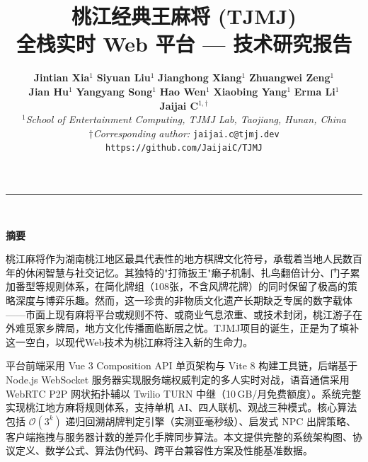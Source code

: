 \documentclass[11pt,a4paper]{article}
\title{\bfseries\LARGE\color{blue!60!black} 桃江经典王麻将 (TJMJ)\\[4pt]
       \large\color{blue!50!black} 全栈实时 Web 平台 — 技术研究报告}
\author{%
  \begin{tabular}{c}
  \small\textbf{Jintian Xia}$^{1}$ \quad \textbf{Siyuan Liu}$^{1}$ \quad \textbf{Jianghong Xiang}$^{1}$ \quad \textbf{Zhuangwei Zeng}$^{1}$ \\
  \small\textbf{Jian Hu}$^{1}$ \quad \textbf{Yangyang Song}$^{1}$ \quad \textbf{Hao Wen}$^{1}$ \quad \textbf{Xiaobing Yang}$^{1}$ \quad \textbf{Erma Li}$^{1}$ \\[4pt]
  \small\textbf{Jaijai C}$^{1,\dagger}$ \\[2pt]
  \small$^{1}$\textit{School of Entertainment Computing, TJMJ Lab, Taojiang, Hunan, China} \\
  \small$\dagger$\textit{Corresponding author: }\texttt{jaijai.c@tjmj.dev} \\[2pt]
  \small\texttt{\color{blue}https://github.com/JaijaiC/TJMJ}
  \end{tabular}
}
\date{}
\begin{document}
\maketitle


\vspace{-8pt}
\begin{center}
{\color{cyan!60!black}\rule{\linewidth}{1.5pt}}\\[2pt]
\begin{minipage}{0.95\linewidth}
{\centering\small\textbf{\color{orange!80!black}摘要}\par}
\vspace{4pt}
\color{black!80}\setlength{\parindent}{2em}
桃江麻将作为湖南桃江地区最具代表性的地方棋牌文化符号，承载着当地人民数百年的休闲智慧与社交记忆。其独特的"打筛扳王"癞子机制、扎鸟翻倍计分、门子累加番型等规则体系，在简化牌组（108张，不含风牌花牌）的同时保留了极高的策略深度与博弈乐趣。然而，这一珍贵的非物质文化遗产长期缺乏专属的数字载体——市面上现有麻将平台或规则不符、或商业气息浓重、或技术封闭，桃江游子在外难觅家乡牌局，地方文化传播面临断层之忧。TJMJ项目的诞生，正是为了填补这一空白，以现代Web技术为桃江麻将注入新的生命力。

平台前端采用 Vue 3 Composition API 单页架构与 Vite 8 构建工具链，后端基于 Node.js WebSocket 服务器实现服务端权威判定的多人实时对战，语音通信采用 WebRTC P2P 网状拓扑辅以 Twilio TURN 中继（10\,GB/月免费额度）。系统完整实现桃江地方麻将规则体系，支持单机 AI、四人联机、观战三种模式。核心算法包括 $\mathcal{O}(3^k)$ 递归回溯胡牌判定引擎（实测亚毫秒级）、启发式 NPC 出牌策略、客户端拖拽与服务器计数的差异化手牌同步算法。本文提供完整的系统架构图、协议定义、数学公式、算法伪代码、跨平台兼容性方案及性能基准数据。


\end{minipage}
\end{center}
\end{document}
